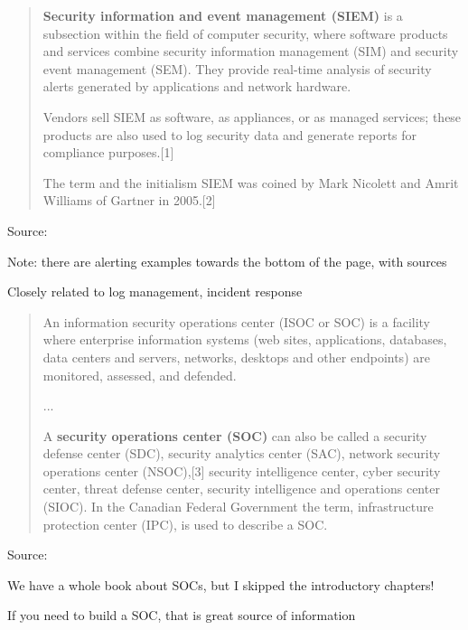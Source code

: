 \documentclass[Screen16to9,17pt]{foils}
\begin{document}


\begin{quote}
{\bf Security information and event management (SIEM)} is a subsection within the field of computer security, where software products and services combine security information management (SIM) and security event management (SEM). They provide real-time analysis of security alerts generated by applications and network hardware.

  Vendors sell SIEM as software, as appliances, or as managed services; these products are also used to log security data and generate reports for compliance purposes.[1]

  The term and the initialism SIEM was coined by Mark Nicolett and Amrit Williams of Gartner in 2005.[2]
\end{quote}
Source: 

\begin{list2}
  \item Note: there are alerting examples towards the bottom of the page, with sources
  \item Closely related to log management, incident response
\end{list2}




\begin{quote}
An information security operations center (ISOC or SOC) is a facility where enterprise information systems (web sites, applications, databases, data centers and servers, networks, desktops and other endpoints) are monitored, assessed, and defended.

...

A {\bf security operations center (SOC)} can also be called a security defense center (SDC), security analytics center (SAC), network security operations center (NSOC),[3] security intelligence center, cyber security center, threat defense center, security intelligence and operations center (SIOC). In the Canadian Federal Government the term, infrastructure protection center (IPC), is used to describe a SOC.
\end{quote}
Source: 

\begin{list2}
  \item We have a whole book about SOCs, but I skipped the introductory chapters!
  \item If you need to build a SOC, that is great source of information
\end{list2}
\end{document}
